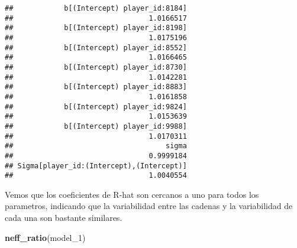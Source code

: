 \documentclass[
]{article}
\newenvironment{Shaded}{\begin{snugshade}}{\end{snugshade}}
\newcommand{\FunctionTok}[1]{\textcolor[rgb]{0.13,0.29,0.53}{\textbf{#1}}}
\newcommand{\NormalTok}[1]{#1}
\begin{document}
\begin{verbatim}
##            b[(Intercept) player_id:8184] 
##                                1.0166517 
##            b[(Intercept) player_id:8198] 
##                                1.0175196 
##            b[(Intercept) player_id:8552] 
##                                1.0166465 
##            b[(Intercept) player_id:8730] 
##                                1.0142281 
##            b[(Intercept) player_id:8883] 
##                                1.0161858 
##            b[(Intercept) player_id:9824] 
##                                1.0153639 
##            b[(Intercept) player_id:9988] 
##                                1.0170311 
##                                    sigma 
##                                0.9999184 
## Sigma[player_id:(Intercept),(Intercept)] 
##                                1.0040554
\end{verbatim}

Vemos que los coeficientes de R-hat son cercanos a uno para todos los
parametros, indicando que la variabilidad entre las cadenas y la
variabilidad de cada una son bastante similares.

\begin{Shaded}
\begin{Highlighting}[]
\FunctionTok{neff\_ratio}\NormalTok{(model\_1)}
\end{Highlighting}
\end{Shaded}
\end{document}
